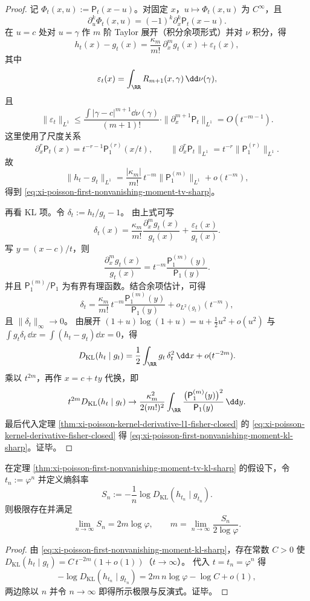 \begin{proof}
记 \(\Phi_t(x,u):=\mathsf P_t(x-u)\)。对固定 \(x\)，\(u\mapsto \Phi_t(x,u)\) 为 \(C^\infty\)，且
\[
\partial_u^k\Phi_t(x,u)=(-1)^k\partial_x^k\mathsf P_t(x-u).
\]
在 \(u=c\) 处对 \(u=\gamma\) 作 \(m\) 阶 Taylor 展开（积分余项形式）并对 \(\nu\) 积分，得
\[
h_t(x)-g_t(x)=\frac{\kappa_m}{m!}\,\partial_x^m g_t(x)+\varepsilon_t(x),
\]
其中
\[
\varepsilon_t(x)
=\int_{\RR}R_{m+1}(x,\gamma)\,\dd\nu(\gamma),
\]
且
\[
\|\varepsilon_t\|_{L^1}
\le
\frac{\int |\gamma-c|^{m+1}\dd\nu(\gamma)}{(m+1)!}
\cdot
\|\partial_x^{m+1}\mathsf P_t\|_{L^1}
=O(t^{-m-1}).
\]
这里使用了尺度关系
\[
\partial_x^r\mathsf P_t(x)=t^{-r-1}\mathsf P_1^{(r)}(x/t),
\qquad
\|\partial_x^r\mathsf P_t\|_{L^1}=t^{-r}\|\mathsf P_1^{(r)}\|_{L^1}.
\]
故
\[
\|h_t-g_t\|_{L^1}
=\frac{|\kappa_m|}{m!}\,t^{-m}\|\mathsf P_1^{(m)}\|_{L^1}+o(t^{-m}),
\]
得到 \eqref{eq:xi-poisson-first-nonvanishing-moment-tv-sharp}。

再看 KL 项。令
\(
\delta_t:=h_t/g_t-1
\)。
由上式可写
\[
\delta_t(x)
=\frac{\kappa_m}{m!}\frac{\partial_x^m g_t(x)}{g_t(x)}+\frac{\varepsilon_t(x)}{g_t(x)}.
\]
写 \(y=(x-c)/t\)，则
\[
\frac{\partial_x^m g_t(x)}{g_t(x)}
=t^{-m}\frac{\mathsf P_1^{(m)}(y)}{\mathsf P_1(y)}.
\]
并且 \(\mathsf P_1^{(m)}/\mathsf P_1\) 为有界有理函数。结合余项估计，可得
\[
\delta_t
=\frac{\kappa_m}{m!}\,t^{-m}\frac{\mathsf P_1^{(m)}(y)}{\mathsf P_1(y)}
+o_{L^2(g_t)}(t^{-m}),
\]
且 \(\|\delta_t\|_\infty\to 0\)。
由展开
\(
(1+u)\log(1+u)=u+\frac12u^2+o(u^2)
\)
与
\(
\int g_t\delta_t\,\dd x=\int(h_t-g_t)\dd x=0
\)，得
\[
D_{\mathrm{KL}}(h_t\mid g_t)
=\frac12\int_{\RR}g_t\,\delta_t^2\,\dd x+o(t^{-2m}).
\]
乘以 \(t^{2m}\)，再作 \(x=c+ty\) 代换，即
\[
t^{2m}D_{\mathrm{KL}}(h_t\mid g_t)
\to
\frac{\kappa_m^2}{2(m!)^2}
\int_{\RR}\frac{\bigl(\mathsf P_1^{(m)}(y)\bigr)^2}{\mathsf P_1(y)}\,\dd y.
\]
最后代入定理
\ref{thm:xi-poisson-kernel-derivative-l1-fisher-closed}
的 \eqref{eq:xi-poisson-kernel-derivative-fisher-closed} 得
\eqref{eq:xi-poisson-first-nonvanishing-moment-kl-sharp}。证毕。
\end{proof}

\begin{corollary}[KL 衰减阶在黄金尺度链上的可审计反演]\label{cor:xi-poisson-golden-chain-entropy-slope-m}
在定理 \ref{thm:xi-poisson-first-nonvanishing-moment-tv-kl-sharp} 的假设下，令 \(t_n:=\varphi^n\) 并定义熵斜率
\[
S_n:=-\frac1n\log D_{\mathrm{KL}}(h_{t_n}\mid g_{t_n}).
\]
则极限存在并满足
\[
\lim_{n\to\infty}S_n=2m\log\varphi,
\qquad
m=\lim_{n\to\infty}\frac{S_n}{2\log\varphi}.
\]
\end{corollary}
\begin{proof}
由 \eqref{eq:xi-poisson-first-nonvanishing-moment-kl-sharp}，存在常数 \(C>0\) 使
\(
D_{\mathrm{KL}}(h_t\mid g_t)=C\,t^{-2m}(1+o(1))
\)（\(t\to\infty\)）。
代入 \(t=t_n=\varphi^n\) 得
\[
-\log D_{\mathrm{KL}}(h_{t_n}\mid g_{t_n})
=2m\,n\log\varphi-\log C+o(1),
\]
两边除以 \(n\) 并令 \(n\to\infty\) 即得所示极限与反演式。证毕。
\end{proof}

